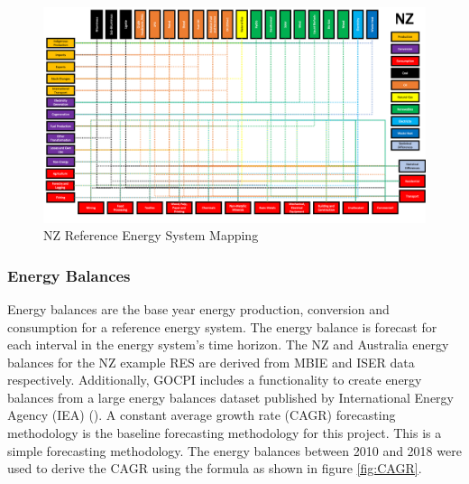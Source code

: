 \documentclass[12pt]{article}
\begin{document}
\begin{figure}[H]
    \centering
    \includegraphics[width = \textwidth]{NZRES.png}
	\caption{NZ Reference Energy System Mapping}
	\label{fig:NZRES}%
\end{figure}

\subsubsection{Energy Balances}
Energy balances are the base year energy production, conversion and consumption for a reference energy system.
The energy balance is forecast for each interval in the energy system's time horizon.
The NZ and Australia energy balances for the NZ example RES are derived from MBIE and ISER data respectively.
Additionally, GOCPI includes a functionality to create energy balances from a large energy balances dataset published by International Energy Agency (IEA) (\cite{IEA_WEB}).
A constant average growth rate (CAGR) forecasting methodology is the baseline forecasting methodology for this project.
This is a simple forecasting methodology. The energy balances between 2010 and 2018 were used to derive the CAGR using the formula as shown in figure \ref{fig:CAGR}.
\end{document}
